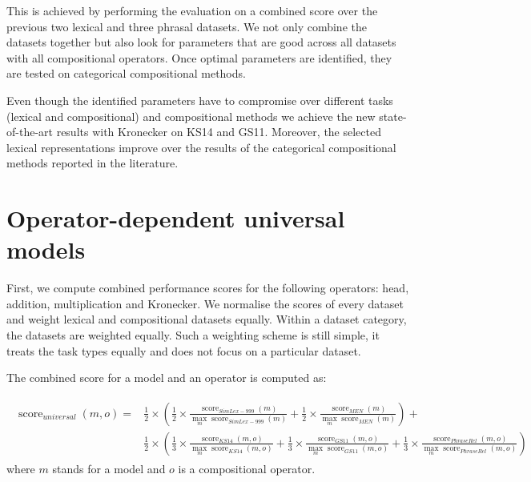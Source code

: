 This is achieved by performing the evaluation on a combined score over the previous two lexical and three phrasal datasets. We not only combine the datasets together but also look for parameters that are good across all datasets with all compositional operators. Once optimal parameters are identified, they are tested on categorical compositional methods.

Even though the identified parameters have to compromise over different tasks (lexical and compositional) and compositional methods we achieve the new state-of-the-art results with Kronecker on KS14 and GS11. Moreover, the selected lexical representations improve over the results of the categorical compositional methods reported in the literature.

\section{Operator-dependent universal models}
\label{sec:model-selection}

First, we compute combined performance scores for the following operators: head, addition, multiplication and Kronecker. We normalise the scores of every dataset and weight lexical and compositional datasets equally. Within a dataset category, the datasets are weighted equally. Such a weighting scheme is still simple, it treats the task types equally and does not focus on a particular dataset.

The combined score for a model and an operator is computed as:

{\scriptsize
  \begin{align}
    \begin{split}
\operatorname{score}_\mathit{universal}(\mathit{m}, \mathit{o}) = & %
\frac{1}{2}\times\left(
\frac{1}{2}\times%
\frac{\operatorname{score}_\mathit{SimLex-999}(\mathit{m})}%
{\max_m\operatorname{score}_\mathit{SimLex-999}(m)}%
+%
\frac{1}{2}\times%
\frac{\operatorname{score}_\mathit{MEN}(\mathit{m})}%
{\max_m\operatorname{score}_\mathit{MEN}(m)}%
\right) +
\\
&\frac{1}{2}\times\left(
\frac{1}{3}\times%
\frac{\operatorname{score}_\mathit{KS14}(\mathit{m}, \mathit{o})}%
{\max_m\operatorname{score}_\mathit{KS14}(m, \mathit{o})}%
+%
\frac{1}{3}\times%
\frac{\operatorname{score}_\mathit{GS11}(\mathit{m}, \mathit{o})}%
{\max_m\operatorname{score}_\mathit{GS11}(m, \mathit{o})}%
+%
\frac{1}{3}\times%
\frac{\operatorname{score}_\mathit{PhraseRel}(\mathit{m, \mathit{o}})}%
{\max_m\operatorname{score}_\mathit{PhraseRel}(m, \mathit{o})}%
\right)
\end{split}
\end{align}
}
where $m$ stands for a model and $o$ is a compositional operator.

